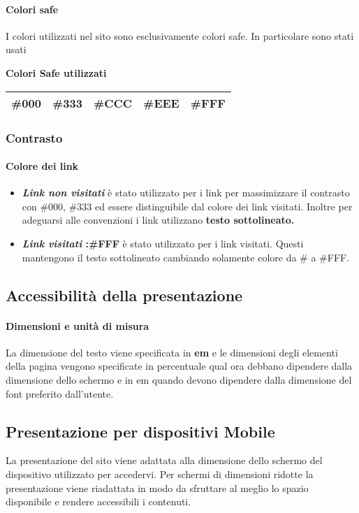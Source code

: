 \documentclass[12pt,a4paper]{article}
\begin{document}
\paragraph{Colori safe}
I colori utilizzati nel sito sono esclusivamente colori safe. In particolare sono stati usati
\begin{center}
	\textbf{Colori Safe utilizzati}
	
	\begin{tabular}{c c c c c}
		\midrule  \#000 & \#333 & \#CCC & \#EEE  &  \#FFF \\ \midrule 
	\end{tabular} 
	
\end{center}
\subsubsection{Contrasto}
\paragraph{Colore dei link}
\begin{itemize}
	\item \textit{\textbf{Link non visitati}} è stato utilizzato per i link per massimizzare il contrasto con \#000, \#333 ed essere distinguibile dal colore dei link visitati. Inoltre per adeguarsi alle convenzioni i link utilizzano \textbf{testo sottolineato.}
	\item \textbf{\textit{Link visitati} :\#FFF }è stato utilizzato per i link visitati. Questi mantengono il testo sottolineato cambiando solamente colore da \# a \#FFF. 
\end{itemize}
\subsection{Accessibilità della presentazione}
\paragraph{Dimensioni e unità di misura} La dimensione del testo viene specificata in \textbf{em} e le dimensioni degli elementi della pagina vengono specificate in percentuale qual ora debbano dipendere dalla dimensione dello schermo e in em quando devono dipendere dalla dimensione del font preferito dall'utente. 

\subsection{Presentazione per dispositivi Mobile}
La presentazione del sito viene adattata alla dimensione dello schermo del dispositivo utilizzato per accedervi. 
Per schermi di dimensioni ridotte la presentazione viene riadattata in modo da sfruttare al meglio lo spazio disponibile e rendere accessibili i contenuti. 
\end{document}
